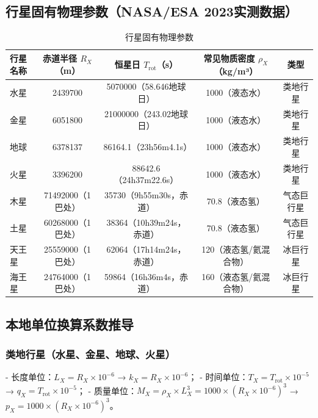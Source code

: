 \documentclass[a4paper, 12pt]{article}
\begin{document}
\subsection{行星固有物理参数（NASA/ESA 2023实测数据）}
\begin{table}[!htbp]
\centering
\caption{行星固有物理参数}
\begin{tabular}{lcccc}
\toprule
行星名称 & 赤道半径 $R_X$（m） & 恒星日 $T_{\text{rot}}$（s） & 常见物质密度 $\rho_X$（kg/m³） & 类型       \\
\midrule
水星     & 2439700                 & 5070000（58.646地球日）          & 1000（液态水）                    & 类地行星   \\
金星     & 6051800                 & 21000000（243.02地球日）         & 1000（液态水）                    & 类地行星   \\
地球     & 6378137                 & 86164.1（23h56m4.1s）            & 1000（液态水）                    & 类地行星   \\
火星     & 3396200                 & 88642.6（24h37m22.6s）           & 1000（液态水）                    & 类地行星   \\
木星     & 71492000（1巴处）       & 35730（9h55m30s，赤道）          & 70.8（液态氢）                    & 气态巨行星 \\
土星     & 60268000（1巴处）       & 38364（10h39m24s，赤道）         & 70.8（液态氢）                    & 气态巨行星 \\
天王星   & 25559000（1巴处）       & 62064（17h14m24s，赤道）         & 120（液态氢/氦混合物）            & 冰巨行星   \\
海王星   & 24764000（1巴处）       & 59864（16h36m4s，赤道）          & 160（液态氢/氦混合物）            & 冰巨行星   \\
\bottomrule
\end{tabular}
\label{tab:planets_params}
\end{table}

\subsection{本地单位换算系数推导}
\subsubsection{类地行星（水星、金星、地球、火星）}
- 长度单位：$L_X = R_X \times 10^{-6}$ → $k_X = R_X \times 10^{-6}$；
- 时间单位：$T_X = T_{\text{rot}} \times 10^{-5}$ → $q_X = T_{\text{rot}} \times 10^{-5}$；
- 质量单位：$M_X = \rho_X \times L_X^3 = 1000 \times (R_X \times 10^{-6})^3$ → $p_X = 1000 \times (R_X \times 10^{-6})^3$。
\end{document}
